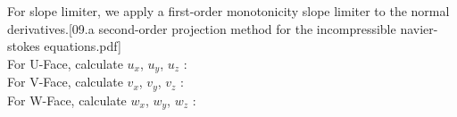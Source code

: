 \documentclass{article}
\numberwithin{equation}{subsection}
\begin{document}

For slope limiter, we apply a first-order monotonicity slope limiter to the normal derivatives.[09.a second-order projection method for the incompressible navier-stokes equations.pdf] \\
For U-Face, calculate $u_x$, $u_y$, $u_z$ :\\
For V-Face, calculate $v_x$, $v_y$, $v_z$ : \\
For W-Face, calculate $w_x$, $w_y$, $w_z$ : \\
\end{document}
